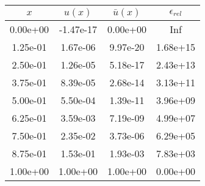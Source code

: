 \begin{tabular}{|c|c|c|c|}
\hline
\textbf{$x$}&\textbf{$u(x)$}&\textbf{$\bar{u}(x)$}&\textbf{$\epsilon_{rel}$}\\\hline
0.00e+00&-1.47e-17&0.00e+00&Inf\\\hline
1.25e-01&1.67e-06&9.97e-20&1.68e+15\\\hline
2.50e-01&1.26e-05&5.18e-17&2.43e+13\\\hline
3.75e-01&8.39e-05&2.68e-14&3.13e+11\\\hline
5.00e-01&5.50e-04&1.39e-11&3.96e+09\\\hline
6.25e-01&3.59e-03&7.19e-09&4.99e+07\\\hline
7.50e-01&2.35e-02&3.73e-06&6.29e+05\\\hline
8.75e-01&1.53e-01&1.93e-03&7.83e+03\\\hline
1.00e+00&1.00e+00&1.00e+00&0.00e+00\\\hline
\end{tabular}
